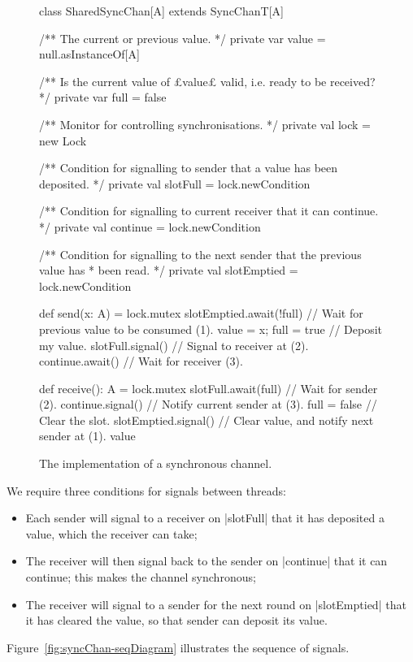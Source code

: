 
\begin{figure}
\begin{scala}
class SharedSyncChan[A] extends SyncChanT[A]{
  /** The current or previous value. */
  private var value = null.asInstanceOf[A]

  /** Is the current value of £value£ valid, i.e. ready to be received? */
  private var full = false

  /** Monitor for controlling synchronisations. */
  private val lock = new Lock

  /** Condition for signalling to sender that a value has been deposited. */
  private val slotFull = lock.newCondition

  /** Condition for signalling to current receiver that it can continue. */
  private val continue = lock.newCondition

  /** Condition for signalling to the next sender that the previous value has
    * been read. */
  private val slotEmptied = lock.newCondition

  def send(x: A) = lock.mutex{
    slotEmptied.await(!full) // Wait for previous value to be consumed (1).
    value = x; full = true   // Deposit my value.
    slotFull.signal()        // Signal to receiver at (2).
    continue.await()         // Wait for receiver (3).
  }

  def receive(): A = lock.mutex{
    slotFull.await(full)               // Wait for sender (2).
    continue.signal()                  // Notify current sender at (3).
    full = false                       // Clear the slot.
    slotEmptied.signal() // Clear value, and notify next sender at (1).
    value
  }
}
\end{scala}
\caption{The implementation of a synchronous channel.}
\label{fig:SharedSyncChan}
\end{figure}


We require three conditions for signals between threads:
%
\begin{itemize}
\item Each sender will signal to a receiver on |slotFull| that it has
  deposited a value, which the receiver can take;

\item The receiver will then signal back to the sender on |continue| that it
  can continue; this makes the channel synchronous;

\item The receiver will signal to a sender for the next round on |slotEmptied|
  that it has cleared the value, so that sender can deposit its value.
\end{itemize}
%
Figure~\ref{fig:syncChan-seqDiagram} illustrates the sequence of signals.

